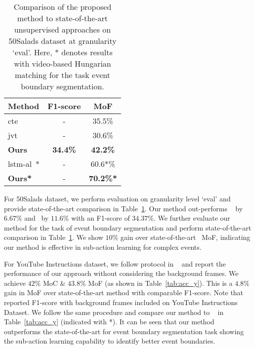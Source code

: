 \documentclass[final]{cvpr}
\begin{document}
\begin{table}[t]
  \caption{ {\small Comparison of the proposed method to state-of-the-art unsupervised approaches on 50Salads dataset at granularity `eval'. Here, * denotes results with video-based Hungarian matching for the task event boundary segmentation.} }
  \label{tab:sal_acc}
  \centering
    \small
  \begin{tabular}{lcc}
    \toprule
    {\bf Method} & {\bf F1-score} & {\bf MoF}\\
    \midrule
    {\sc cte}~\cite{kukleva2019unsupervised}  & - & 35.5\%      \\
    {\sc jvt}~\cite{vidalmata2020joint} & - & 30.6\% \\
    \midrule
    {\bf Ours}  & \textbf{34.4\%} &  \textbf{42.2\%}  \\
    \midrule
    \midrule
    {\sc lstm-al}~\cite{aakur2019perceptual}* & - & 60.6*\% \\
    {\bf Ours*}  & - & \textbf{70.2\%*} \\
    \bottomrule
  \end{tabular}
\end{table}


\par For 50Salads dataset, we perform evaluation on granularity level `eval' and provide state-of-the-art comparison in Table~\ref{tab:sal_acc}. Our method out-performs ~\cite{kukleva2019unsupervised} by $6.67\%$ and~\cite{vidalmata2020joint} by $11.6\%$ with an F1-score of $34.37\%$. We further evaluate our method for the task of event boundary segmentation and perform state-of-the-art comparison in Table~\ref{tab:sal_acc}. We show $10\%$ gain over state-of-the-art~\cite{aakur2019perceptual} MoF, indicating our method is effective in sub-action learning for complex events. 

\par For YouTube Instructions dataset, we follow protocol in ~\cite{Alayrac16unsupervised, sener2018unsupervised, kukleva2019unsupervised} and report the performance of our approach without considering the background frames.
We achieve $42\%$ MoC \& $43.8\%$ MoF (as shown in Table~\ref{tab:acc_y}). 
This is a $4.8\%$ gain in MoF over state-of-the-art method with comparable F1-score. 
Note that ~\cite{aakur2019perceptual} reported F1-score with background frames included on YouTube Instructions Dataset. We follow the same procedure and compare our method to ~\cite{aakur2019perceptual} in Table~\ref{tab:acc_y} (indicated with *). It can be seen that our method outperforms the state-of-the-art for event boundary segmentation task showing the sub-action learning capability to identify better event boundaries.
\end{document}
